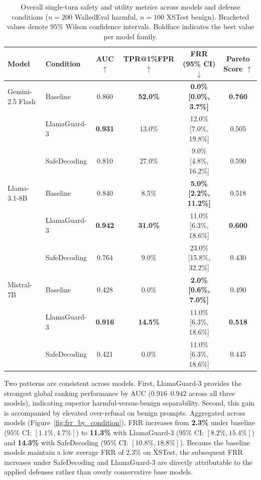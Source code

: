 \documentclass[10pt, twocolumn]{article}
\begin{document}
\begin{table}[t]
\centering
\caption{Overall single-turn safety and utility metrics across models and defense conditions ($n=200$ WalledEval harmful, $n=100$ XSTest benign). Bracketed values denote $95\%$ Wilson confidence intervals. Boldface indicates the best value per model family.}
\label{tab:overall_safety_metrics}
\setlength{\tabcolsep}{8pt}
\renewcommand{\arraystretch}{1.15}
\begin{tabular}{@{}llcccc@{}}
\toprule
\textbf{Model} & \textbf{Condition} & \textbf{AUC} $\uparrow$ & \textbf{TPR@1\%FPR} $\uparrow$ & \textbf{FRR (95\% CI)} $\downarrow$ & \textbf{Pareto Score} $\uparrow$ \\
\midrule
Gemini-2.5 Flash & Baseline      & 0.860 & \textbf{52.0\%} & \textbf{0.0\% [0.0\%, 3.7\%]}   & \textbf{0.760} \\
                 & LlamaGuard-3  & \textbf{0.931} & 13.0\% & 12.0\% [7.0\%, 19.8\%] & 0.505 \\
                 & SafeDecoding  & 0.810 & 27.0\% & 9.0\% [4.8\%, 16.2\%]  & 0.590 \\
\midrule
Llama-3.1-8B     & Baseline      & 0.840 & 8.5\%  & \textbf{5.0\% [2.2\%, 11.2\%]}  & 0.518 \\
                 & LlamaGuard-3  & \textbf{0.942} & \textbf{31.0\%} & 11.0\% [6.3\%, 18.6\%] & \textbf{0.600} \\
                 & SafeDecoding  & 0.764 & 9.0\%  & 23.0\% [15.8\%, 32.2\%] & 0.430 \\
\midrule
Mistral-7B       & Baseline      & 0.428 & 0.0\%  & \textbf{2.0\% [0.6\%, 7.0\%]}   & 0.490 \\
                 & LlamaGuard-3  & \textbf{0.916} & \textbf{14.5\%} & 11.0\% [6.3\%, 18.6\%] & \textbf{0.518} \\
                 & SafeDecoding  & 0.421 & 0.0\%  & 11.0\% [6.3\%, 18.6\%] & 0.445 \\
\bottomrule
\end{tabular}
\end{table}

Two patterns are consistent across models. First, LlamaGuard-3 provides the strongest global ranking performance by AUC ($0.916$--$0.942$ across all three models), indicating superior harmful-versus-benign separability. Second, this gain is accompanied by elevated over-refusal on benign prompts. Aggregated across models (Figure~\ref{fig:frr_by_condition}), FRR increases from \textbf{2.3\%} under baseline ($95\%$ CI: $[1.1\%, 4.7\%]$) to \textbf{11.3\%} with LlamaGuard-3 ($95\%$ CI: $[8.2\%, 15.4\%]$) and \textbf{14.3\%} with SafeDecoding ($95\%$ CI: $[10.8\%, 18.8\%]$). Because the baseline models maintain a low average FRR of $2.3\%$ on XSTest, the subsequent FRR increases under SafeDecoding and LlamaGuard-3 are directly attributable to the applied defenses rather than overly conservative base models.
\end{document}
